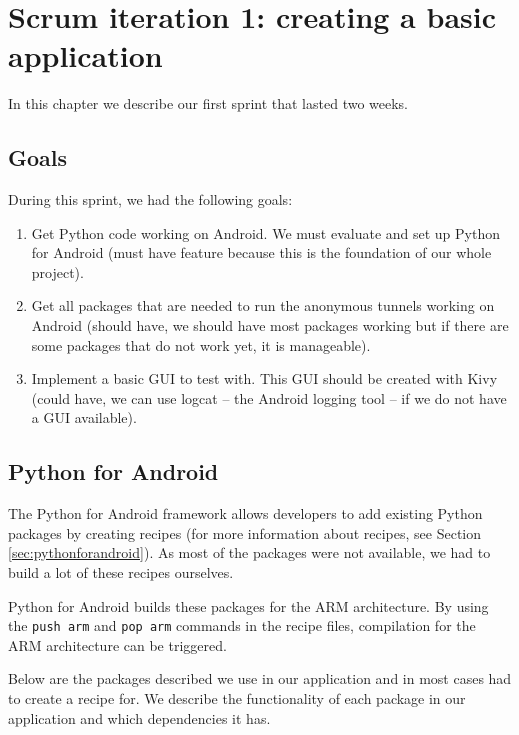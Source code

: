\chapter{Scrum iteration 1: creating a basic application}
\label{cpt:iteration1}
	In this chapter we describe our first sprint that lasted two weeks.

	\section{Goals}
		During this sprint, we had the following goals:
	
		\begin{enumerate}
			\item Get Python code working on Android. We must evaluate and set up Python for Android (must have feature because this is the foundation of our whole project).
			\item Get all packages that are needed to run the anonymous tunnels working on Android (should have, we should have most packages working but if there are some packages that do not work yet, it is manageable).
			\item Implement a basic GUI to test with. This GUI should be created with Kivy (could have, we can use logcat -- the Android logging tool -- if we do not have a GUI available).
		\end{enumerate}
	
	\section{Python for Android}
		The Python for Android framework allows developers to add existing Python packages by creating recipes (for more information about recipes, see Section \ref{sec:pythonforandroid}). As most of the packages were not available, we had to build a lot of these recipes ourselves.
	
		Python for Android builds these packages for the ARM architecture. By using the \texttt{push arm} and \texttt{pop arm} commands in the recipe files, compilation for the ARM architecture can be triggered.
	
		Below are the packages described we use in our application and in most cases had to create a recipe for. We describe the functionality of each package in our application and which dependencies it has.
	
